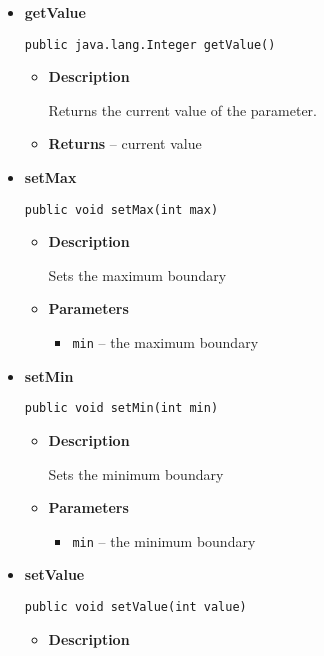 {{{{\begin{itemize}
{\begin{itemize}
{Returns the minimum boundary.
}
\item{{\bf  Returns} -- 
the minimum boundary 
}%
\end{itemize}
}%
\item{ 
{\bf  getValue}\\
\begin{lstlisting}[frame=none]
public java.lang.Integer getValue()\end{lstlisting} %
\begin{itemize}
\item{
{\bf  Description}

Returns the current value of the parameter.
}
\item{{\bf  Returns} -- 
current value 
}%
\end{itemize}
}%
\item{ 
{\bf  setMax}\\
\begin{lstlisting}[frame=none]
public void setMax(int max)\end{lstlisting} %
\begin{itemize}
\item{
{\bf  Description}

Sets the maximum boundary
}
\item{
{\bf  Parameters}
  \begin{itemize}
   \item{
\texttt{min} -- the maximum boundary}
  \end{itemize}
}%
\end{itemize}
}%
\item{ 
{\bf  setMin}\\
\begin{lstlisting}[frame=none]
public void setMin(int min)\end{lstlisting} %
\begin{itemize}
\item{
{\bf  Description}

Sets the minimum boundary
}
\item{
{\bf  Parameters}
  \begin{itemize}
   \item{
\texttt{min} -- the minimum boundary}
  \end{itemize}
}%
\end{itemize}
}%
\item{ 
{\bf  setValue}\\
\begin{lstlisting}[frame=none]
public void setValue(int value)\end{lstlisting} %
\begin{itemize}
\item{
{\bf  Description}

}
\end{itemize}}
\end{itemize}}}}}
